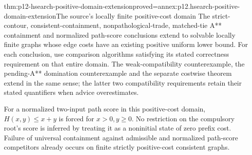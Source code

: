 \begin{hbcorollary}{thm:p12-hsearch-positive-domain-extension}{proved=annex:p12.hsearch-positive-domain-extension}{The source's locally finite positive-cost domain}
The strict-contour, consistent-containment, nonpathological-trade,
matched-tie A** containment and normalized path-score conclusions extend
to solvable locally finite graphs whose edge costs have an existing
positive uniform lower bound. For each conclusion, use comparison
algorithms satisfying its stated correctness requirement on that entire
domain. The weak-compatibility counterexample, the pending-A** domination
counterexample and the separate costwise theorem extend in the same sense;
the latter two compatibility requirements retain their stated quantifiers
when advice overestimates.

For a normalized two-input path score in this positive-cost domain,
\(H(x,y)\le x+y\) is forced for \(x>0,y\ge 0\). No restriction
on the compulsory root's score is inferred by treating it as a noninitial
state of zero prefix cost. Failure of universal containment against
admissible and normalized path-score competitors already occurs on
finite strictly positive-cost consistent graphs.
\end{hbcorollary}
